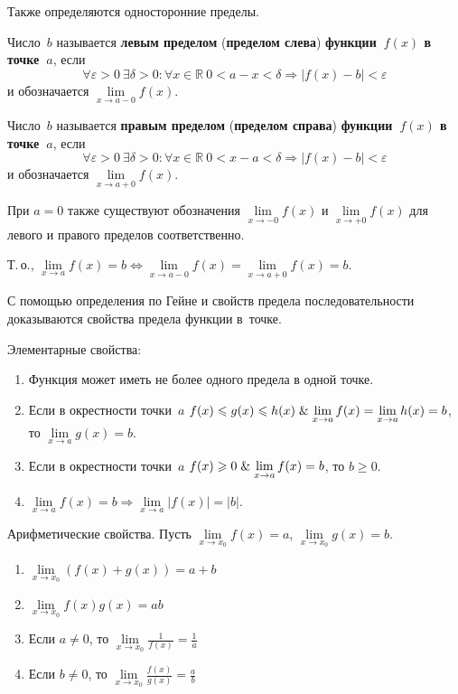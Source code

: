 Также определяются односторонние пределы.

Число~$b$ называется \textbf{левым пределом} (\textbf{пределом слева}) \textbf{функции~$f(x)$ в точке~$a$}, если
\begin{equation*}
\forall \varepsilon > 0 \ \exists \delta > 0 \colon \forall x \in \mathbb R \ 0 < a - x < \delta \Rightarrow |f(x) - b| < \varepsilon
\end{equation*}
и обозначается $\lim\limits_{x \to a-0} f(x)$.

Число~$b$ называется \textbf{правым пределом} (\textbf{пределом справа}) \textbf{функции~$f(x)$ в точке~$a$}, если
\begin{equation*}
\forall \varepsilon > 0 \ \exists \delta > 0 \colon \forall x \in \mathbb R \ 0 < x - a < \delta \Rightarrow |f(x) - b| < \varepsilon
\end{equation*}
и обозначается $\lim\limits_{x \to a+0} f(x)$.

При $a = 0$ также существуют обозначения $\lim\limits_{x \to -0} f(x)$ и $\lim\limits_{x \to +0} f(x)$ для левого и правого пределов соответственно.

Т.\,о., $\lim\limits_{x \to a} f(x) = b \Leftrightarrow \lim\limits_{x \to a-0} f(x) = \lim\limits_{x \to a+0} f(x) = b$.

С помощью определения по Гейне и свойств предела последовательности доказываются свойства предела функции в~точке.

Элементарные свойства:
\begin{enumerate}
	\item Функция может иметь не более одного предела в одной точке.
	\item {}
	\begin{theorem}
	\label{th:about_two_policemen}
	Если в окрестности точки~$a$ $f(x) \leqslant g(x) \leqslant h(x) \lAnd \lim\limits_{x \to a} f(x) \opbr= \lim\limits_{x \to a} h(x) \opbr= b$, то $\lim\limits_{x \to a} g(x) = b$.
	\end{theorem}
	\item Если в окрестности точки~$a$ $f(x) \geqslant 0 \mathrel{\&} \lim\limits_{x \to a} f(x) = b$, то $b \geqslant 0$.
	\item $\lim\limits_{x \to a} f(x) = b \Rightarrow \lim\limits_{x \to a} |f(x)| = |b|$.
\end{enumerate}

Арифметические свойства.
Пусть $\lim\limits_{x \to x_0} f(x) = a$, $\lim\limits_{x \to x_0} g(x) = b$.
\begin{enumerate}
	\item $\lim\limits_{x \to x_0} (f(x) + g(x)) = a + b$
	\item $\lim\limits_{x \to x_0} f(x)g(x) = ab$
	\item Если $a \neq 0$, то $\lim\limits_{x \to x_0} \frac1{f(x)} = \frac1a$
	\item Если $b \neq 0$, то $\lim\limits_{x \to x_0} \frac{f(x)}{g(x)} = \frac{a}b$
\end{enumerate}

